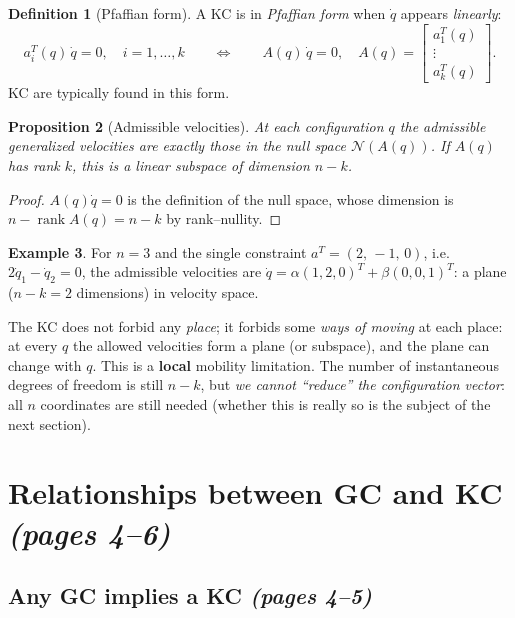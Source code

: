 \documentclass[11pt,a4paper]{article}
\theoremstyle{definition}
\newtheorem{definition}{Definition}[section]
\newtheorem{example}[definition]{Example}
\theoremstyle{plain}
\newtheorem{proposition}[definition]{Proposition}
\theoremstyle{remark}
\begin{document}
\begin{definition}[Pfaffian form]
A KC is in \emph{Pfaffian form} when $\dot q$ appears \emph{linearly}:
\[
a_i^{T}(q)\,\dot q=0,\quad i=1,\dots,k
\qquad\Longleftrightarrow\qquad
A(q)\,\dot q=0,\quad A(q)=\begin{bmatrix}a_1^{T}(q)\\ \vdots\\ a_k^{T}(q)\end{bmatrix}.
\]
KC are typically found in this form.
\end{definition}
 
\begin{proposition}[Admissible velocities]
At each configuration $q$ the admissible generalized velocities are exactly those in the null space $\mathcal N(A(q))$. If $A(q)$ has rank $k$, this is a linear subspace of dimension $n-k$.
\end{proposition}
\begin{proof}
$A(q)\dot q=0$ is the definition of the null space, whose dimension is $n-\operatorname{rank}A(q)=n-k$ by rank--nullity.
\end{proof}
 
\begin{example}
For $n=3$ and the single constraint $a^{T}=(2,\,-1,\,0)$, i.e.\ $2\dot q_1-\dot q_2=0$, the admissible velocities are $\dot q=\alpha(1,2,0)^{T}+\beta(0,0,1)^{T}$: a plane ($n-k=2$ dimensions) in velocity space.
\end{example}
 
\begin{intuition}
The KC does not forbid any \emph{place}; it forbids some \emph{ways of moving} at each place: at every $q$ the allowed velocities form a plane (or subspace), and the plane can change with $q$. This is a \textbf{local} mobility limitation. The number of instantaneous degrees of freedom is still $n-k$, but \emph{we cannot ``reduce'' the configuration vector}: all $n$ coordinates are still needed (whether this is really so is the subject of the next section).
\end{intuition}
 
\section{Relationships between GC and KC \emph{(pages 4--6)}}
 
\subsection{Any GC implies a KC \emph{(pages 4--5)}}
 
\end{document}
